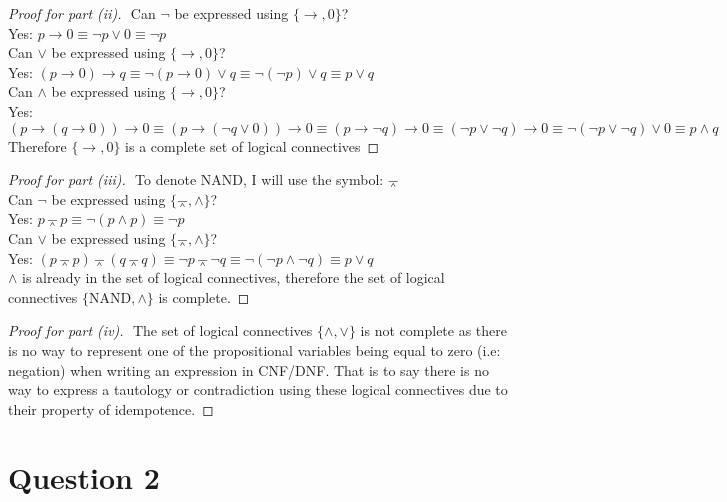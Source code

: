 \documentclass[12pt]{fphw}
\begin{document}
\begin{proof}[Proof for part (ii)] $ $ \newline
  Can $\neg$ be expressed using $\{\to, 0\}$? \\
  Yes: $p \to 0 \equiv \neg p \vee 0 \equiv \neg p$ \\ 
  Can $\vee$ be expressed using $\{\to, 0\}$? \\ 
  Yes: $(p \to 0) \to q \equiv \neg (p \to 0) \vee q \equiv \neg (\neg p ) \vee q \equiv p \vee q$ \\ 
  Can $\wedge$ be expressed using $\{\to, 0\}$? \\ 
  Yes: $(p \to (q \to 0)) \to 0 \equiv (p \to (\neg q \vee 0)) \to 0 \equiv (p \to \neg q) \to 0 \equiv (\neg p \vee \neg q) \to 0 \equiv \neg(\neg p \vee \neg q) \vee 0 \equiv p \wedge q$ \\ 
  Therefore $\{\to, 0\}$ is a complete set of logical connectives
\end{proof}

\begin{proof}[Proof for part (iii)] $ $ \newline
 To denote NAND, I will use the symbol: $\barwedge$ \\ 
 Can $\neg$ be expressed using $\{\barwedge, \wedge\}$? \\ 
 Yes: $p \barwedge p \equiv \neg(p \wedge p) \equiv \neg p$ \\ 
 Can $\vee$ be expressed using $\{\barwedge, \wedge\}$? \\ 
 Yes: $(p \barwedge p) \barwedge (q \barwedge q) \equiv \neg p \barwedge \neg q \equiv \neg(\neg p \wedge \neg q) \equiv p \vee q$ \\ 
 $\wedge$ is already in the set of logical connectives, therefore the set of logical connectives $\{\text{NAND}, \wedge\}$ is complete.
\end{proof}

\begin{proof}[Proof for part (iv)] $ $ \newline
The set of logical connectives $\{\wedge, \vee\}$ is not complete as there is no way to represent one of the propositional variables being equal to zero (i.e: negation) when writing an expression in CNF/DNF. That is to say there is no way to express a tautology or contradiction using these logical connectives due to their property of idempotence.
\end{proof}
\section*{Question 2}
\end{document}
